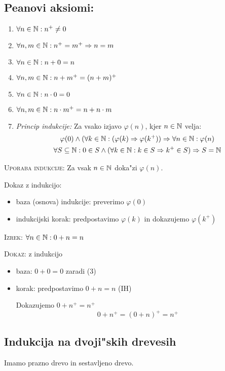 \subsection{Peanovi aksiomi:}
\begin{enumerate}
	\item $\forall n \in \mathbb{N}: n^+ \neq 0$
	\item $\forall n, m \in \mathbb{N}: n^+ = m^+ \Rightarrow n = m$
	\item $\forall n \in \mathbb{N}: n + 0 = n$
	\item $\forall n, m \in \mathbb{N}: n + m^+ = (n + m)^+$
	\item $\forall n \in \mathbb{N}: n \cdot 0 = 0$
	\item $\forall n, m \in \mathbb{N}: n \cdot m^+ = n + n \cdot m$
	\item \emph{Princip indukcije:} Za vsako izjavo $\varphi(n)$, kjer $n \in \mathbb{N}$ velja:
	\begin{gather*}
		\varphi(0) \land (\forall k \in \mathbb{N}: (\varphi(k) \Rightarrow \varphi(k^+)) \Rightarrow \forall n \in \mathbb{N}: \varphi(n) \\
		\forall S \subseteq \mathbb{N}: 0 \in S \land (\forall k \in \mathbb{N}: k \in S \Rightarrow k^+ \in S) \Rightarrow S = \mathbb{N}
	\end{gather*}
\end{enumerate}
\textsc{Uporaba indukcije}: Za vsak $n \in \mathbb{N}$ doka"zi $\varphi(n)$.

Dokaz z indukcijo:
\begin{itemize}
	\item baza (osnova) indukcije: preverimo $\varphi(0)$
	\item  indukcijski korak: predpostavimo $\varphi(k)$ in dokazujemo $\varphi (k^+)$
\end{itemize}
%
\textsc{Izrek:} $\forall n \in \mathbb{N}: 0+n = n$

\textsc{Dokaz:} z indukcijo
\begin{itemize}
	\item baza: $0 + 0 = 0 $ zaradi (3)
	\item korak: predpostavimo $0 + n = n$ (IH)
	
	Dokazujemo $0 + n^+ = n^+$
	\begin{equation*}
	0 + n^+ = (0 + n)^+ = n^+
	\end{equation*}
\end{itemize}
%
\subsection{Indukcija na dvoji"skih drevesih}
Imamo prazno drevo in sestavljeno drevo.

